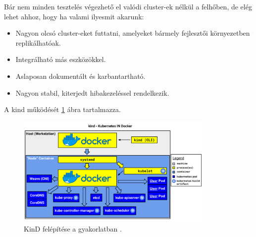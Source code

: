 Bár nem minden tesztelés végezhető el valódi cluster-ek nélkül a felhőben, de elég lehet ahhoz, hogy ha valami ilyesmit akarunk: \cite{KinD}
\begin{itemize}
    \item Nagyon olcsó cluster-eket futtatni, amelyeket bármely fejlesztői környezetben replikálhatóak.
    \item Integrálható más eszközökkel.
    \item Aslaposan dokumentált és karbantartható.
    \item Nagyon stabil, kiterjedt hibakezeléssel rendelkezik.
\end{itemize}

A kind működését \ref{kind-overview} ábra tartalmazza.

\begin{figure}[ht]
    \centering
         \includegraphics[width=0.85\textwidth]{figures/kubernetes/kind-overview.png}
          \caption{KinD felépítése a gyakorlatban \cite{KinD}.}
           \label{kind-overview}
\end{figure}